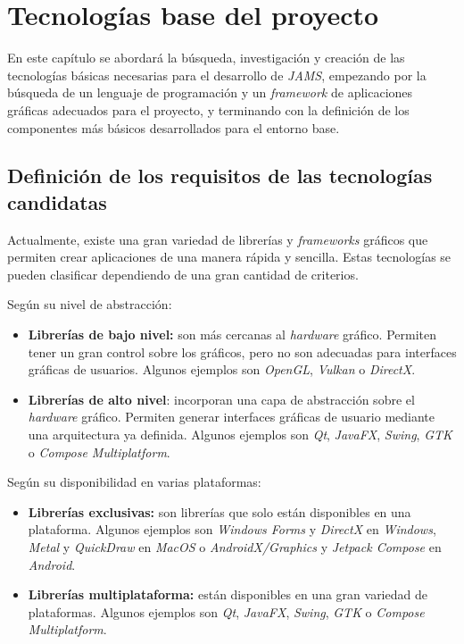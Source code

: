 \chapter{Tecnologías base del proyecto}\label{ch:tecnologias-base-del-proyecto}

En este capítulo se abordará la búsqueda, investigación y creación de las tecnologías
básicas necesarias para el desarrollo de \textit{JAMS}, empezando por la búsqueda
de un lenguaje de programación y un \textit{framework} de aplicaciones gráficas adecuados
para el proyecto, y terminando con la definición
de los componentes más básicos desarrollados para el entorno base.

\section{Definición de los requisitos de las tecnologías candidatas}
\label{sec:definicion-requisitos-tecnologías-candidatas}

Actualmente, existe una gran variedad de librerías y \textit{frameworks} gráficos que permiten
crear aplicaciones de una manera rápida y sencilla.
Estas tecnologías se pueden clasificar dependiendo de una gran cantidad de criterios.

Según su nivel de abstracción:
\begin{itemize}
    \item \textbf{Librerías de bajo nivel:} son más cercanas al \textit{hardware} gráfico.
    Permiten tener un gran control sobre los gráficos, pero no son adecuadas para
    interfaces gráficas de usuarios.
    Algunos ejemplos son \textit{OpenGL}\cite{OPENGL},
    \textit{Vulkan}\cite{VULKAN} o \textit{DirectX}\cite{DIRECTX}.
    \item \textbf{Librerías de alto nivel}: incorporan una capa de abstracción sobre el \textit{hardware} gráfico.
    Permiten generar interfaces gráficas de usuario mediante una arquitectura ya definida.
    Algunos ejemplos son \textit{Qt}\cite{QT},
    \textit{JavaFX}\cite{JAVAFX}, \textit{Swing}\cite{SWING}, \textit{GTK} o
    \textit{Compose Multiplatform}\cite{COMPOSE}.
\end{itemize}

Según su disponibilidad en varias plataformas:
\begin{itemize}
    \item \textbf{Librerías exclusivas:} son librerías que solo están disponibles en una plataforma.
    Algunos ejemplos son \textit{Windows Forms}\cite{WINDOWSFORMS}
    y \textit{DirectX} en \textit{Windows},
    \textit{Metal} y \textit{QuickDraw} en \textit{MacOS}
    o \textit{AndroidX/Graphics} y \textit{Jetpack Compose}\cite{COMPOSE}
    en \textit{Android}.
    \item \textbf{Librerías multiplataforma:} están disponibles en una gran variedad de plataformas.
    Algunos ejemplos son \textit{Qt}, \textit{JavaFX}, \textit{Swing}, \textit{GTK}
    o \textit{Compose Multiplatform}.
\end{itemize}


